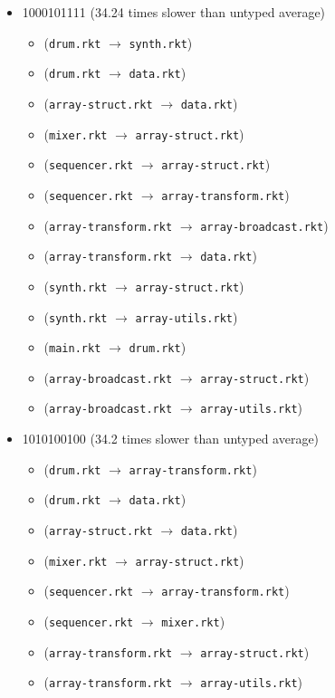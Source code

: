 \documentclass{article}
\newcommand{\mono}[1]{\texttt{#1}}
\begin{document}
\begin{itemize}
\begin{itemize}
  \end{itemize}
\item 1000101111 (34.24 times slower than untyped average)
  \begin{itemize}
  \item (\mono{drum.rkt} $\rightarrow$ \mono{synth.rkt})
  \item (\mono{drum.rkt} $\rightarrow$ \mono{data.rkt})
  \item (\mono{array-struct.rkt} $\rightarrow$ \mono{data.rkt})
  \item (\mono{mixer.rkt} $\rightarrow$ \mono{array-struct.rkt})
  \item (\mono{sequencer.rkt} $\rightarrow$ \mono{array-struct.rkt})
  \item (\mono{sequencer.rkt} $\rightarrow$ \mono{array-transform.rkt})
  \item (\mono{array-transform.rkt} $\rightarrow$ \mono{array-broadcast.rkt})
  \item (\mono{array-transform.rkt} $\rightarrow$ \mono{data.rkt})
  \item (\mono{synth.rkt} $\rightarrow$ \mono{array-struct.rkt})
  \item (\mono{synth.rkt} $\rightarrow$ \mono{array-utils.rkt})
  \item (\mono{main.rkt} $\rightarrow$ \mono{drum.rkt})
  \item (\mono{array-broadcast.rkt} $\rightarrow$ \mono{array-struct.rkt})
  \item (\mono{array-broadcast.rkt} $\rightarrow$ \mono{array-utils.rkt})
  \end{itemize}
\item 1010100100 (34.2 times slower than untyped average)
  \begin{itemize}
  \item (\mono{drum.rkt} $\rightarrow$ \mono{array-transform.rkt})
  \item (\mono{drum.rkt} $\rightarrow$ \mono{data.rkt})
  \item (\mono{array-struct.rkt} $\rightarrow$ \mono{data.rkt})
  \item (\mono{mixer.rkt} $\rightarrow$ \mono{array-struct.rkt})
  \item (\mono{sequencer.rkt} $\rightarrow$ \mono{array-transform.rkt})
  \item (\mono{sequencer.rkt} $\rightarrow$ \mono{mixer.rkt})
  \item (\mono{array-transform.rkt} $\rightarrow$ \mono{array-struct.rkt})
  \item (\mono{array-transform.rkt} $\rightarrow$ \mono{array-utils.rkt})

\end{itemize}
\end{itemize}
\end{document}
